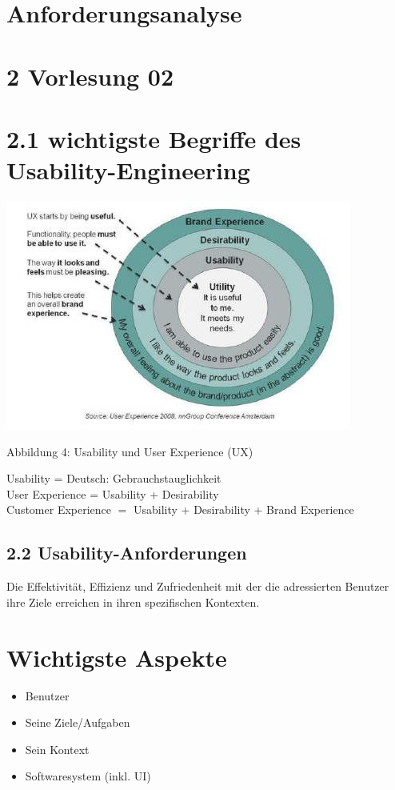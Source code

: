 \section{Anforderungsanalyse}

\section*{2 Vorlesung 02}
\section*{2.1 wichtigste Begriffe des Usability-Engineering}
\begin{center}
\includegraphics[width=\linewidth]{images/2024_12_29_0d1d7b5551ea1b4b41bdg-02}
\end{center}


Abbildung 4: Usability und User Experience (UX)


Usability = Deutsch: Gebrauchstauglichkeit\\
User Experience = Usability + Desirability\\
Customer Experience $=$ Usability + Desirability + Brand Experience

\subsection*{2.2 Usability-Anforderungen}
Die Effektivität, Effizienz und Zufriedenheit mit der die adressierten Benutzer ihre Ziele erreichen in ihren spezifischen Kontexten.

\section*{Wichtigste Aspekte}
\begin{itemize}
  \item Benutzer
  \item Seine Ziele/Aufgaben
  \item Sein Kontext
  \item Softwaresystem (inkl. UI)
\end{itemize}

